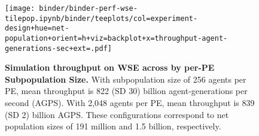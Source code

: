 \begin{figure}
\texttt{[image: binder/binder-perf-wse-tilepop.ipynb/binder/teeplots/col=experiment-design+hue=net-population+orient=h+viz=backplot+x=throughput-agent-generations-sec+ext=.pdf]}

\caption{
\textbf{Simulation throughput on WSE across by per-PE Subpopulation Size.}
\footnotesize
With subpopulation size of 256 agents per PE, mean throughput is 822 (SD 30) billion agent-generations per second (AGPS).
With 2,048 agents per PE, mean throughput is 839 (SD 2) billion AGPS.
These configurations correspond to net population sizes of 191 million and 1.5 billion, respectively.
}
\label{fig:perf-tilepop}

\end{figure}
